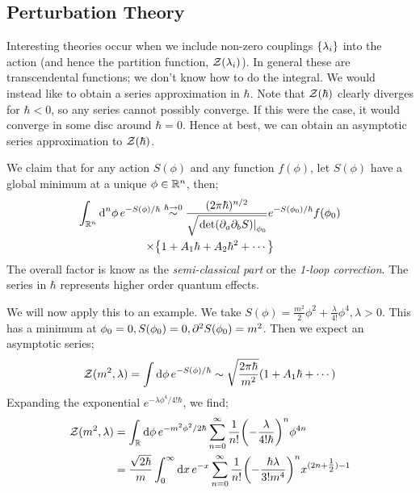 \subsection{Perturbation Theory}
Interesting theories occur when we include non-zero couplings $\set{\lambda_i}$ into the action (and hence the partition function, $\mathcal{Z}(\lambda_i)$). In general these are transcendental functions; we don't know how to do the integral. We would instead like to obtain a series approximation in $\hbar$. Note that $\mathcal{Z}(\hbar)$ clearly diverges for $\hbar < 0$, so any series cannot possibly converge. If this were the case, it would converge in some disc around $\hbar = 0$. Hence at best, we can obtain an asymptotic series approximation to $\mathcal{Z}(\hbar)$.\footnotemark
{}
\begin{thm}
We claim that for any action $S(\phi)$ and any function $f(\phi)$, let $S(\phi)$ have a global minimum at a unique $\phi \in \mathbb{R}^n$, then;
\begin{multline}
\int_{\RR^n}{\upd{^n \phi}e^{-S(\phi)/\hbar}} \overset{\hbar \rightarrow 0}{\sim} \frac{(2\pi \hbar)^{n/2}}{\sqrt{\left.\det(\del_a \del_b S)\right|_{\phi_0}}}e^{-S(\phi_0)/\hbar}f(\phi_0) \\ \times \set{1 + A_1 \hbar + A_2 \hbar^2 + \cdots}
\end{multline}
The overall factor is know as the \emph{semi-classical part} or the \emph{1-loop correction}. The series in $\hbar$ represents higher order quantum effects.
\end{thm}
We will now apply this to an example. We take $S(\phi) = \tfrac{m^2}{2}\phi^2 + \tfrac{\lambda}{4!}\phi^4, \lambda > 0$. This has a minimum at $\phi_0 = 0, S(\phi_0) = 0, \partial^2 S(\phi_0) = m^2$. Then we expect an asymptotic series;
\begin{equation}
\mZ(m^2, \lambda) = \int{\upd{\phi} e^{-S(\phi)/\hbar}} \sim \sqrt{\frac{2\pi\hbar}{m^2}}\left(1 + A_1 \hbar + \cdots\right)
\end{equation}
Expanding the exponential $e^{-\lambda \phi^4 / 4!\hbar}$, we find;
\begin{align*}
\mZ(m^2, \lambda) &= \int_{\RR}{\upd{\phi}e^{-m^2 \phi^2/2\hbar}\sum_{n = 0}^{\infty}{\frac{1}{n!}\left(-\frac{\lambda}{4!\hbar}\right)^n \phi^{4n}}} \\
&= \frac{\sqrt{2\hbar}}{m}\int_{0}^{\infty}{\upd{x}e^{-x}\sum_{n=0}^{\infty}{\frac{1}{n!}\left(-\frac{\hbar \lambda}{3! m^4}\right)^{n}x^{(2n + \tfrac{1}{2}) - 1}}}
\end{align*}

